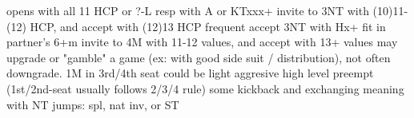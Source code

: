 opens with all 11 HCP or ?-L
    resp with A or KTxxx+
invite to 3NT with (10)11-(12) HCP, and accept with (12)13 HCP
frequent accept 3NT with Hx+ fit in partner's 6+m
invite to 4M with 11-12 values, and accept with 13+ values
may upgrade or "gamble" a game (ex: with good side suit / distribution), not often downgrade.
1M in 3rd/4th seat could be light
aggresive high level preempt (1st/2nd-seat usually follows 2/3/4 rule)
some kickback and exchanging meaning with NT
jumps: spl, nat inv, or ST